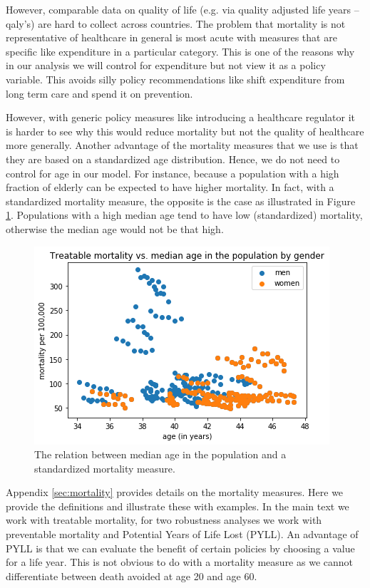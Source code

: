 \documentclass{article}
\begin{document}
However, comparable data on quality of life (e.g. via quality adjusted life years --qaly's) are hard to collect across countries. The problem that mortality is not representative of healthcare in general is most acute with measures that are specific like expenditure in a particular category. This is one of the reasons why in our analysis we will control for expenditure but not view it as a policy variable. This avoids silly policy recommendations like shift expenditure from long term care and spend it on prevention.

However, with generic policy measures like introducing a healthcare regulator it is harder to see why this would reduce mortality but not the quality of healthcare more generally. Another advantage of the mortality measures that we use is that they are based on a standardized age distribution. Hence, we do not need to control for age in our model. For instance, because a population with a high fraction of elderly can be expected to have higher mortality. In fact, with a standardized mortality measure, the opposite is the case as illustrated in Figure \ref{fig:org8710a6c}. Populations with a high median age tend to have low (standardized) mortality, otherwise the median age would not be that high.

\begin{figure}[htbp]
\centering
\includegraphics[width=.9\linewidth]{./figures/age.png}
\caption{\label{fig:org8710a6c}The relation between median age in the population and a standardized mortality measure.}
\end{figure}

Appendix \ref{sec:mortality} provides details on the mortality measures. Here we provide the definitions and illustrate these with examples. In the main text we work with treatable mortality, for two robustness analyses we work with preventable mortality and Potential Years of Life Lost (PYLL). An advantage of PYLL is that we can evaluate the benefit of certain policies by choosing a value for a life year. This is not obvious to do with a mortality measure as we cannot differentiate between death avoided at age 20 and age 60.
\end{document}
